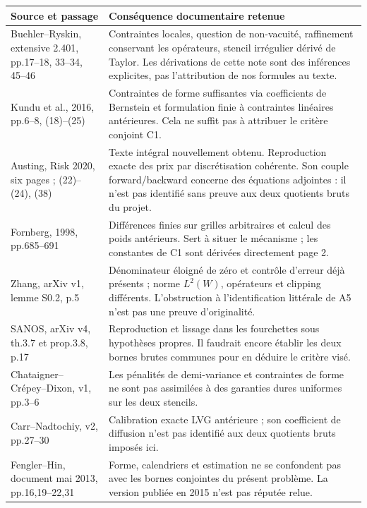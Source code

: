 \documentclass[10pt,a4paper]{article}
\newcommand{\BR}{Buehler--Ryskin}
\begin{document}
\begin{tabularx}{\textwidth}{@{}>{\raggedright\arraybackslash}p{31mm}X@{}}\toprule
Source et passage & Conséquence documentaire retenue\\\midrule
\BR{}, extensive 2.401, pp.17--18, 33--34, 45--46 & Contraintes locales, question de non-vacuité, raffinement conservant les opérateurs, stencil irrégulier dérivé de Taylor. Les dérivations de cette note sont des inférences explicites, pas l'attribution de nos formules au texte.\\[2mm]
Kundu et al., 2016, pp.6--8, (18)--(25) & Contraintes de forme suffisantes via coefficients de Bernstein et formulation finie à contraintes linéaires antérieures. Cela ne suffit pas à attribuer le critère conjoint C1.\\[2mm]
Austing, Risk 2020, six pages ; (22)--(24), (38) & Texte intégral nouvellement obtenu. Reproduction exacte des prix par discrétisation cohérente. Son couple forward/backward concerne des équations adjointes : il n'est pas identifié sans preuve aux deux quotients bruts du projet.\\[2mm]
Fornberg, 1998, pp.685--691 & Différences finies sur grilles arbitraires et calcul des poids antérieurs. Sert à situer le mécanisme ; les constantes de C1 sont dérivées directement page 2.\\[2mm]
Zhang, arXiv v1, lemme S0.2, p.5 & Dénominateur éloigné de zéro et contrôle d'erreur déjà présents ; norme $L^2(W)$, opérateurs et clipping différents. L'obstruction à l'identification littérale de A5 n'est pas une preuve d'originalité.\\[2mm]
SANOS, arXiv v4, th.3.7 et prop.3.8, p.17 & Reproduction et lissage dans les fourchettes sous hypothèses propres. Il faudrait encore établir les deux bornes brutes communes pour en déduire le critère visé.\\[2mm]
Chataigner--Crépey--Dixon, v1, pp.3--6 & Les pénalités de demi-variance et contraintes de forme ne sont pas assimilées à des garanties dures uniformes sur les deux stencils.\\[2mm]
Carr--Nadtochiy, v2, pp.27--30 & Calibration exacte LVG antérieure ; son coefficient de diffusion n'est pas identifié aux deux quotients bruts imposés ici.\\[2mm]
Fengler--Hin, document mai 2013, pp.16,19--22,31 & Forme, calendriers et estimation ne se confondent pas avec les bornes conjointes du présent problème. La version publiée en 2015 n'est pas réputée relue.\\\bottomrule
\end{tabularx}
\end{document}
